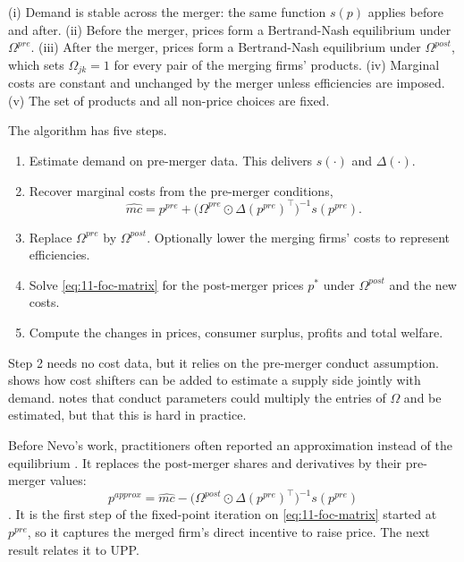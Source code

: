 \begin{assumption}\label{ass:11-sim}
(i) Demand is stable across the merger: the same function $s(p)$ applies before and after. (ii) Before the merger,
prices form a Bertrand-Nash equilibrium under $\Omega^{pre}$. (iii) After the merger, prices form a Bertrand-Nash
equilibrium under $\Omega^{post}$, which sets $\Omega_{jk} = 1$ for every pair of the merging firms' products.
(iv) Marginal costs are constant and unchanged by the merger unless efficiencies are imposed. (v) The set of products
and all non-price choices are fixed.
\end{assumption}

The algorithm has five steps.
\begin{enumerate}[label=(\arabic*)]
  \item Estimate demand on pre-merger data. This delivers $s(\cdot)$ and $\Delta(\cdot)$.
  \item Recover marginal costs from the pre-merger conditions,
        \begin{equation}\label{eq:11-mc-recover}
          \widehat{mc} = p^{pre} + \big(\Omega^{pre} \odot \Delta(p^{pre})^\top\big)^{-1} s(p^{pre}) .
        \end{equation}
  \item Replace $\Omega^{pre}$ by $\Omega^{post}$. Optionally lower the merging firms' costs to represent efficiencies.
  \item Solve \eqref{eq:11-foc-matrix} for the post-merger prices $p^*$ under $\Omega^{post}$ and the new costs.
  \item Compute the changes in prices, consumer surplus, profits and total welfare.
\end{enumerate}
Step 2 needs no cost data, but it relies on the pre-merger conduct assumption.  shows how cost shifters
can be added to estimate a supply side jointly with demand. \citet[eq.~(9)]{Nevo2000b} notes that
conduct parameters could multiply the entries of $\Omega$ and be estimated, but that this is hard in practice.

 Before Nevo's work, practitioners often reported an approximation instead of the
equilibrium \citep{HausmanLeonardZona1994,Werden1997}. It replaces the post-merger shares and derivatives by their
pre-merger values:
\begin{equation}\label{eq:11-approx}
  p^{approx} = \widehat{mc} - \big(\Omega^{post} \odot \Delta(p^{pre})^\top\big)^{-1} s(p^{pre})
\end{equation}
\citep[eq.~(11)]{Nevo2000b}. It is the first step of the fixed-point iteration on \eqref{eq:11-foc-matrix} started at
$p^{pre}$, so it captures the merged firm's direct incentive to raise price. The next result relates it to UPP.

